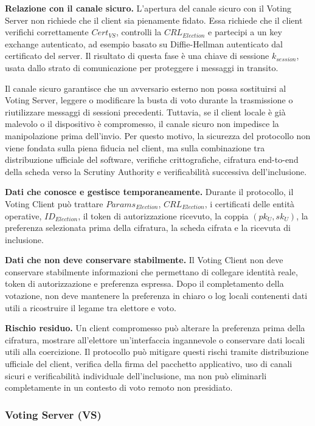 \documentclass[a4paper,12pt]{article}
\begin{document}
\textbf{Relazione con il canale sicuro.}
L'apertura del canale sicuro con il Voting Server non richiede che il client sia pienamente fidato.
Essa richiede che il client verifichi correttamente \(Cert_{VS}\), controlli la \(CRL_{Election}\) e partecipi a un key exchange autenticato, ad esempio basato su Diffie-Hellman autenticato dal certificato del server.
Il risultato di questa fase \`e una chiave di sessione \(k_{session}\), usata dallo strato di comunicazione per proteggere i messaggi in transito.

Il canale sicuro garantisce che un avversario esterno non possa sostituirsi al Voting Server, leggere o modificare la busta di voto durante la trasmissione o riutilizzare messaggi di sessioni precedenti.
Tuttavia, se il client locale \`e gi\`a malevolo o il dispositivo \`e compromesso, il canale sicuro non impedisce la manipolazione prima dell'invio.
Per questo motivo, la sicurezza del protocollo non viene fondata sulla piena fiducia nel client, ma sulla combinazione tra distribuzione ufficiale del software, verifiche crittografiche, cifratura end-to-end della scheda verso la Scrutiny Authority e verificabilit\`a successiva dell'inclusione.

\textbf{Dati che conosce e gestisce temporaneamente.}
Durante il protocollo, il Voting Client pu\`o trattare \(Params_{Election}\), \(CRL_{Election}\), i certificati delle entit\`a operative, \(ID_{Election}\), il token di autorizzazione ricevuto, la coppia \((pk_U, sk_U)\), la preferenza selezionata prima della cifratura, la scheda cifrata e la ricevuta di inclusione.

\textbf{Dati che non deve conservare stabilmente.}
Il Voting Client non deve conservare stabilmente informazioni che permettano di collegare identit\`a reale, token di autorizzazione e preferenza espressa.
Dopo il completamento della votazione, non deve mantenere la preferenza in chiaro o log locali contenenti dati utili a ricostruire il legame tra elettore e voto.

\textbf{Rischio residuo.}
Un client compromesso pu\`o alterare la preferenza prima della cifratura, mostrare all'elettore un'interfaccia ingannevole o conservare dati locali utili alla coercizione.
Il protocollo pu\`o mitigare questi rischi tramite distribuzione ufficiale del client, verifica della firma del pacchetto applicativo, uso di canali sicuri e verificabilit\`a individuale dell'inclusione, ma non pu\`o eliminarli completamente in un contesto di voto remoto non presidiato.

\subsubsection{Voting Server (VS)}
\end{document}
